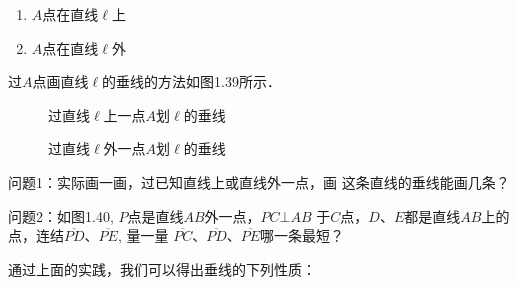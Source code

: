 \begin{solution}
\begin{enumerate}
	\item $A$点在直线$\ell$上
	\item $A$点在直线$\ell$外
\end{enumerate}
过$A$点画直线$\ell$的垂线的方法如图1.39所示．

\begin{figure}[htp]\centering
	\def\pencil#1#2{
		\begin{scope}[shift={#1}, rotate=#2]
			\draw (-0.1,1) -- (-0.1,0.3) -- (0,0) -- (0.1,0.3) -- (0.1,1);
			\draw (-0.1,0.3) -- (0.1,0.3);
			\draw[fill=black] (-0.03,0.09)--(0,0)--(0.03,0.09)--cycle;
			\draw[fill=black] (0.07,0.3)--(0.1,0.3)--(0.1,1)--(0.07,1)--cycle;
		\end{scope}
	}
	\begin{minipage}[t]{0.48\textwidth}
		\centering
		\caption*{过直线$\ell$上一点$A$划$\ell$的垂线}
	\end{minipage}
	\begin{minipage}[t]{0.48\textwidth}
	\centering
	\caption*{过直线$\ell$外一点$A$划$\ell$的垂线}
	\end{minipage}
	\caption{}
	\end{figure}
\end{solution}

问题1：实际画一画，过已知直线上或直线外一点，画
这条直线的垂线能画几条？

问题2：如图1.40, $P$点是直线$AB$外一点，$PC\bot AB$
于$C$点，$D$、$E$都是直线$AB$上的点，连结$\overline{PD}$、$\overline{PE}$, 量一量
$\overline{PC}$、$\overline{PD}$、$\overline{PE}$哪一条最短？

通过上面的实践，我们可以得出垂线的下列性质：

